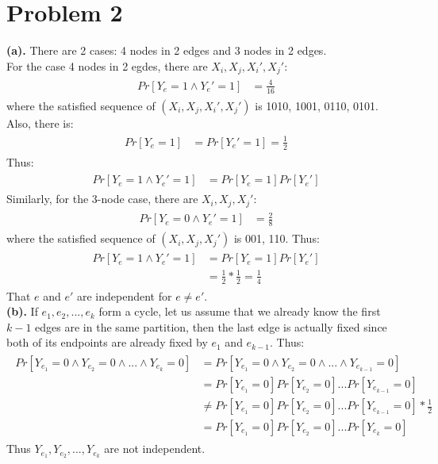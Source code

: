 \documentclass[titlepage, paper=a4, fontsize=11pt]{scrartcl} %
\numberwithin{equation}{section} %
\numberwithin{figure}{section} %
\numberwithin{table}{section} %
\begin{document}

\section*{Problem 2}
\textbf{(a).}
There are 2 cases: 4 nodes in 2 edges and 3 nodes in 2 edges. \\

For the case 4 nodes in 2 egdes, there are $X_i, X_j, X_i', X_j'$:
\begin{align*} 
\begin{split}
Pr[Y_e=1 \land Y_e'=1] &= \frac{4}{16}
\end{split}
\end{align*}
where the satisfied sequence of $(X_i, X_j, X_i', X_j')$ is 1010, 1001, 0110, 0101.
Also, there is:
\begin{align*} 
\begin{split}
Pr[Y_e=1] &= Pr[Y_e'=1] = \frac{1}{2}
\end{split}
\end{align*}
Thus:
\begin{align*} 
\begin{split}
Pr[Y_e=1 \land Y_e'=1] &= Pr[Y_e=1]Pr[Y_e']
\end{split}
\end{align*}
Similarly, for the 3-node case, there are $X_i, X_j, X_j'$:
\begin{align*} 
\begin{split}
Pr[Y_e=0 \land Y_e'=1] &= \frac{2}{8}
\end{split}
\end{align*}
where the satisfied sequence of $(X_i, X_j, X_j')$ is 001, 110.
Thus:
\begin{align*} 
\begin{split}
Pr[Y_e=1 \land Y_e'=1] &= Pr[Y_e=1]Pr[Y_e'] \\
&= \frac{1}{2} * \frac{1}{2} = \frac{1}{4}
\end{split}
\end{align*}
That $e$ and $e'$ are independent for $e \neq e'$.
\\

\textbf{(b).}
If $e_1,e_2, ... , e_k$ form a cycle, let us assume that we already know the first $k-1$ edges are in the same partition, then the last edge is actually fixed since both of its endpoints are already fixed by $e_1$ and $e_{k-1}$.
Thus:
\begin{align*} 
\begin{split}
Pr[Y_{e_1}=0 \land Y_{e_2}=0 \land ... \land Y_{e_k}=0] &= Pr[Y_{e_1}=0 \land Y_{e_2}=0 \land ... \land Y_{e_{k-1}}=0] \\
&= Pr[Y_{e_1}=0]Pr[Y_{e_2}=0]...Pr[Y_{e_{k-1}}=0] \\
&\neq Pr[Y_{e_1}=0]Pr[Y_{e_2}=0]...Pr[Y_{e_{k-1}}=0] * \frac{1}{2} \\
&= Pr[Y_{e_1}=0]Pr[Y_{e_2}=0]...Pr[Y_{e_{k}}=0]
\end{split}
\end{align*}
Thus $Y_{e_1},Y_{e_2}, ... , Y_{e_k}$ are not independent.
\end{document}
